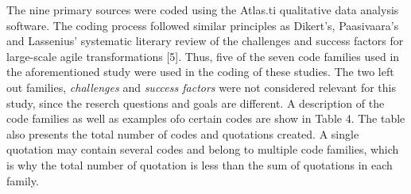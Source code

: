 The nine primary sources were coded using the Atlas.ti qualitative data
analysis software. The coding process followed similar principles as
Dikert's, Paasivaara's and Lassenius' systematic literary review of the
challenges and success factors for large-scale agile transformations
[5]. Thus, five of the seven code families used in the aforementioned
study were used in the coding of these studies. The two left out
families, \textit{challenges} and \textit{success factors} were not
considered relevant for this study, since the reserch questions and
goals are different. A description of the code families as well as
examples ofo certain codes are show in Table 4. The table also presents
the total number of codes and quotations created. A single quotation may
contain several codes and belong to multiple code families, which is why
the total number of quotation is less than the sum of quotations in each
family.

\bigskip

\bigskip
